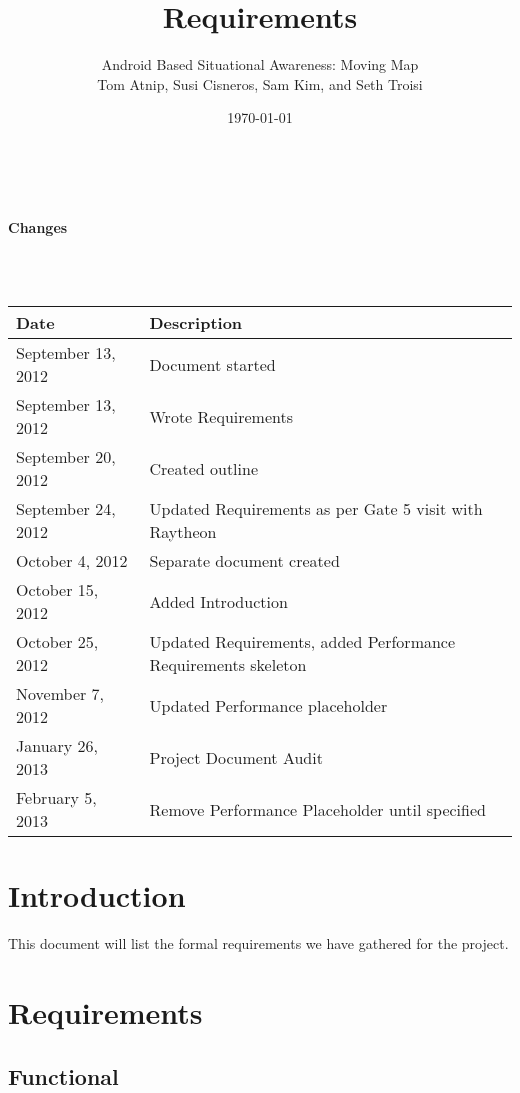 \documentclass{article}
\begin{document}
\setlength{\voffset}{3.5in}
\title{Requirements}
\author{\Large Android Based Situational Awareness: Moving Map\\
Tom Atnip, Susi Cisneros, Sam Kim, and Seth Troisi}
\date{\today}
\maketitle
\clearpage
\setlength{\voffset}{0pt}
\tableofcontents
\clearpage
~\\
\begin{Large}\textbf{Changes}\end{Large}\\
~\\
\begin{tabular}{ | p{1.5in} | p{4.5in} | }
\hline
\textbf{Date} & \textbf{Description}\\
\hline
\hline
September 13, 2012 & Document started\\
\hline
September 13, 2012 & Wrote Requirements\\
\hline
September 20, 2012 & Created outline\\
\hline
September 24, 2012 & Updated Requirements as per Gate 5 visit with Raytheon\\
\hline
October 4, 2012 & Separate document created\\
\hline
October 15, 2012 & Added Introduction\\
\hline
October 25, 2012 & Updated Requirements, added Performance Requirements skeleton\\
\hline
November 7, 2012 & Updated Performance placeholder\\
\hline
January 26, 2013 & Project Document Audit\\
\hline
February 5, 2013 & Remove Performance Placeholder until specified\\
\hline
\end{tabular}
\clearpage

\section{Introduction}
This document will list the formal requirements we have gathered for the project.


\section{Requirements}

\subsection{Functional}
\end{document}
